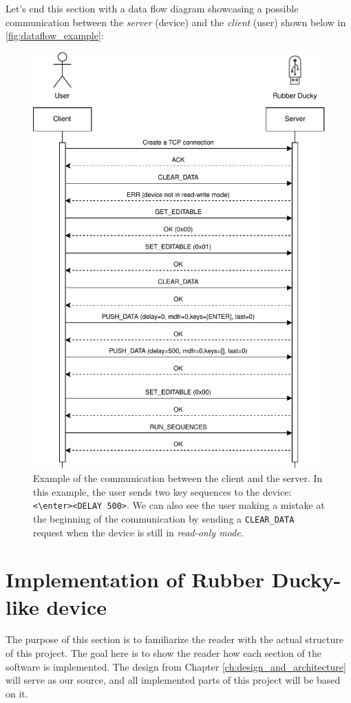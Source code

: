 Let's end this section with a data flow diagram showcasing a possible communication between the \emph{server} (device) and the \emph{client} (user) shown below in \autoref{fig:dataflow_example}:
\begin{figure}[ht]
    \centering
    \includegraphics[width=0.72\linewidth]{obrazky-figures/dataflow.pdf}
    \caption{Example of the communication between the client and the server. In this example, the user sends two key sequences to the device: \texttt{<\textbackslash{}enter><DELAY 500>}. We can also see the user making a mistake at the beginning of the communication by sending a \texttt{CLEAR\_DATA} request when the device is still in \emph{read-only mode}.}
    \label{fig:dataflow_example}
\end{figure}


\chapter{Implementation of Rubber Ducky-like device}
\label{ch:implementation}
The purpose of this section is to familiarize the reader with the actual structure of this project. The goal here is to show the reader how each section of the software is implemented. The design from Chapter \ref{ch:design_and_architecture} will serve as our source, and all implemented parts of this project will be based on it.

